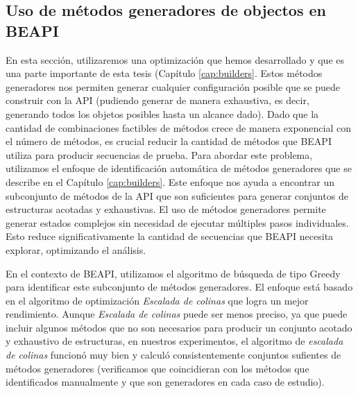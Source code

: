 \subsection{Uso de m\'etodos generadores de objectos en BEAPI}
\label{sec:buildersOptimization}
En esta sección, utilizaremos una optimización que hemos desarrollado y que es
una parte importante de esta tesis (Capítulo \ref{cap:builders}.
Estos métodos generadores nos permiten generar cualquier configuración posible que se puede construir con la API (pudiendo generar de manera exhaustiva, es decir, generando todos los objetos posibles hasta un alcance dado).
Dado que la cantidad de combinaciones factibles de métodos crece de manera exponencial con el número de métodos,
es crucial reducir la cantidad de métodos que \textsf{BEAPI} utiliza para producir secuencias de prueba. Para abordar este problema, 
utilizamos el enfoque de identificación automática de métodos generadores que se describe en el Capítulo \ref{cap:builders}.
Este enfoque nos ayuda a encontrar un subconjunto de métodos de la API que son suficientes para generar conjuntos de estructuras acotadas y exhaustivas. 
El uso de métodos generadores permite generar estados complejos sin necesidad de ejecutar múltiples pasos individuales. Esto reduce significativamente la cantidad de secuencias que BEAPI necesita explorar, optimizando el análisis. 

En el contexto de \textsf{BEAPI}, utilizamos el algoritmo de búsqueda de tipo Greedy para identificar este subconjunto de métodos generadores.
El enfoque está basado en el algoritmo de optimización \emph{Escalada de colinas} que logra un mejor rendimiento. 
Aunque \emph{Escalada de colinas} puede ser menos preciso, ya que puede incluir algunos métodos que no son necesarios para producir un conjunto acotado y exhaustivo de estructuras, 
en nuestros experimentos, el algoritmo de \emph{escalada de colinas}  funcionó muy bien y calculó consistentemente conjuntos sufientes de métodos generadores (verificamos que coincidieran con los métodos que identificados manualmente y que son generadores en cada caso de estudio). 


